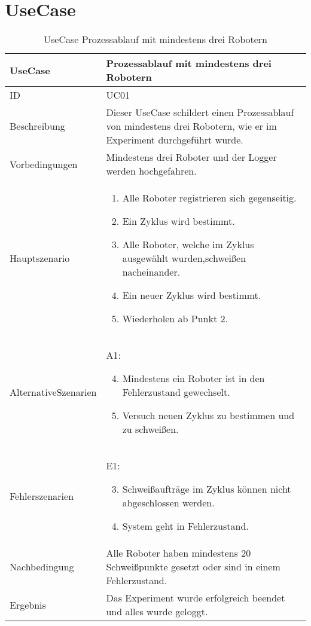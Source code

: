 \section{UseCase}
\begin{table}[h!]
\begin{center}
\begin{tabular}{ |p{2.8cm}|p{11cm}| } 
 \hline
 UseCase & Prozessablauf mit mindestens drei Robotern \\
 \hline
 ID & UC01 \\
 \hline
 Beschreibung & Dieser UseCase schildert einen Prozessablauf von mindestens drei Robotern, wie
 er im Experiment durchgeführt wurde. \\
 \hline
 Vorbedingungen & Mindestens drei Roboter und der Logger werden hochgefahren.\\
 \hline
 Hauptszenario & 
 \begin{enumerate}
  \item Alle Roboter registrieren sich gegenseitig.
  \item Ein Zyklus wird bestimmt.
  \item Alle Roboter, welche im Zyklus ausgewählt wurden,\newline schweißen nacheinander.
  \item Ein neuer Zyklus wird bestimmt.
  \item Wiederholen ab Punkt 2.
 \end{enumerate} \\
 \hline
 Alternative\newline Szenarien &
 A1: \newline
 \begin{enumerate}
  \setcounter{enumi}{3}
  \item Mindestens ein Roboter ist in den Fehlerzustand gewechselt.
  \item Versuch neuen Zyklus zu bestimmen und zu schweißen.
 \end{enumerate}  \\
 \hline
 Fehlerszenarien & 
 E1: \newline
 \begin{enumerate}
   \setcounter{enumi}{2}
   \item Schweißaufträge im Zyklus können nicht abgeschlossen werden.
   \item System geht in Fehlerzustand.
 \end{enumerate} \\
 \hline
 Nachbedingung & Alle Roboter haben mindestens 20 Schweißpunkte gesetzt oder sind in einem Fehlerzustand. \\
 \hline
 Ergebnis & Das Experiment wurde erfolgreich beendet und alles wurde geloggt. \\ 
 \hline
\end{tabular}
\caption{UseCase Prozessablauf mit mindestens drei Robotern}
\label{table:usecase1}
\end{center}
\end{table}
